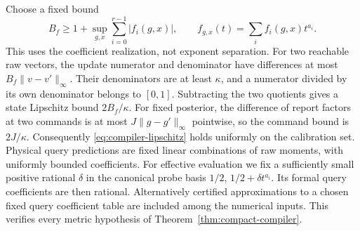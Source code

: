 Choose a fixed bound
\[
 B_f\ge1+\sup_{g,x}\sum_{i=0}^{r-1}|f_i(g,x)|,
 \qquad f_{g,x}(t)=\sum_i f_i(g,x)t^{a_i}.
\]
This uses the coefficient realization, not exponent separation.
For two reachable raw vectors, the update numerator and denominator
have differences at most $B_f\|v-v'\|_\infty$. Their denominators
are at least $\kappa$, and a numerator divided by its own denominator
belongs to $[0,1]$. Subtracting the two quotients gives a state
Lipschitz bound $2B_f/\kappa$. For fixed posterior, the difference of
report factors at two commands is at most $J\|g-g'\|_\infty$
pointwise, so the command bound is $2J/\kappa$. Consequently
\eqref{eq:compiler-lipschitz} holds uniformly on the calibration set.
Physical query predictions are fixed linear combinations of raw moments,
with uniformly bounded coefficients. For effective evaluation we fix
a sufficiently small positive rational $\delta$ in the canonical
probe basis $1/2$, $1/2+\delta t^{a_i}$. Its formal query coefficients
are then rational. Alternatively certified approximations to a chosen
fixed query coefficient table are included among the numerical inputs.
This verifies every metric
hypothesis of Theorem~\ref{thm:compact-compiler}.

